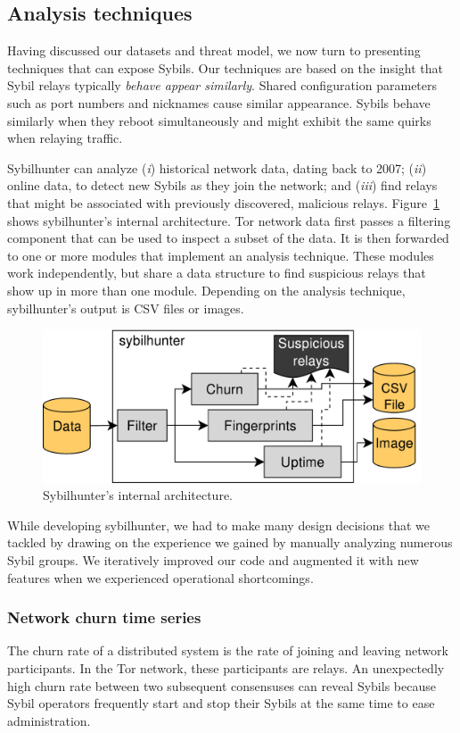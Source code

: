 \subsection{Analysis techniques}
\label{sec:techniques}
Having discussed our datasets and threat model, we now turn to presenting
techniques that can expose Sybils.  Our techniques are based on the insight that
Sybil relays typically \emph{behave appear similarly}.  Shared configuration
parameters such as port numbers and nicknames cause similar appearance.  Sybils
behave similarly when they reboot simultaneously and might exhibit the same
quirks when relaying traffic.

Sybilhunter can analyze (\emph{i}) historical network data, dating back to 2007;
(\emph{ii}) online data, to detect new Sybils as they join the network; and
(\emph{iii}) find relays that might be associated with previously discovered,
malicious relays.  Figure~\ref{fig:shr-internal} shows sybilhunter's internal
architecture.  Tor network data first passes a filtering component that can be
used to inspect a subset of the data.  It is then forwarded to one or more
modules that implement an analysis technique.  These modules work independently,
but share a data structure to find suspicious relays that show up in more than
one module.  Depending on the analysis technique, sybilhunter's output is CSV
files or images.

\begin{figure}[t]
	\centering
	\includegraphics[width=0.9\linewidth]{diagrams/sybilhunter-internal.pdf}
	\caption{Sybilhunter's internal architecture.}
	\label{fig:shr-internal}
\end{figure}

While developing sybilhunter, we had to make many design decisions that we
tackled by drawing on the experience we gained by manually analyzing numerous
Sybil groups.  We iteratively improved our code and augmented it with new
features when we experienced operational shortcomings.

\subsubsection{Network churn time series}
\label{sec:churn-time-series}
The churn rate of a distributed system is the rate of joining and leaving
network participants.  In the Tor network, these participants are relays.  An
unexpectedly high churn rate between two subsequent consensuses can reveal
Sybils because Sybil operators frequently start and stop their Sybils at the
same time to ease administration.


